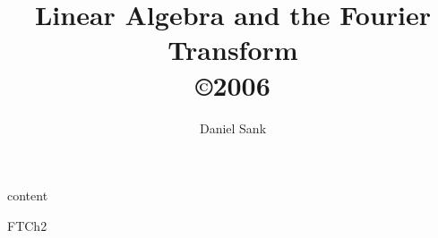 \documentclass{report}
\author{Daniel Sank}
\title{Linear Algebra and the Fourier Transform \\
\copyright 2006}
\begin{document}
\maketitle

\tableofcontents

{content}

{FTCh2}
\end{document}
